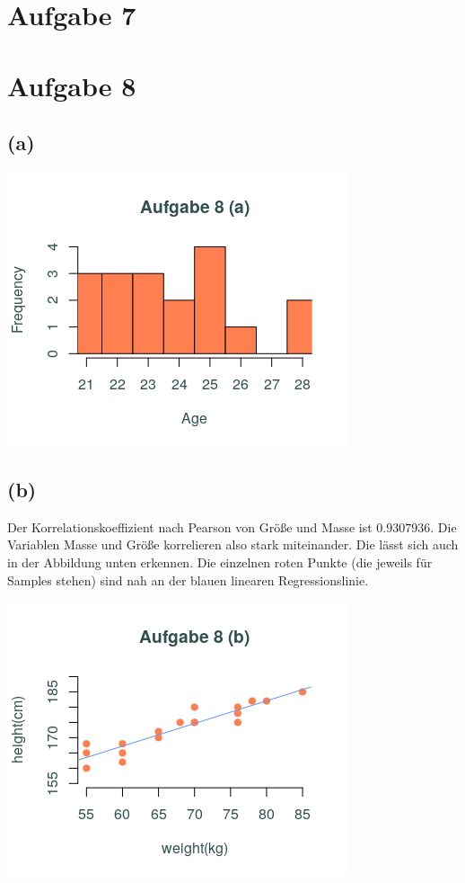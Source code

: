 \documentclass[a4paper]{scrartcl}
\begin{document}
\section*{Aufgabe 7}


\section*{Aufgabe 8}
\subsection*{(a)}
\begin{center}
	\includegraphics*[scale = 0.5]{aufgabe_8_a.png}
\end{center}


\subsection*{(b)}
Der Korrelationskoeffizient nach Pearson von Größe und Masse ist $0.9307936$. Die Variablen Masse und Größe korrelieren also stark miteinander. Die lässt sich auch in der Abbildung unten erkennen. Die einzelnen roten Punkte (die jeweils für Samples stehen) sind nah an der blauen linearen Regressionslinie.
\begin{center}
	\includegraphics*[scale = 0.5]{aufgabe_8_b.png}
\end{center}
\end{document}
